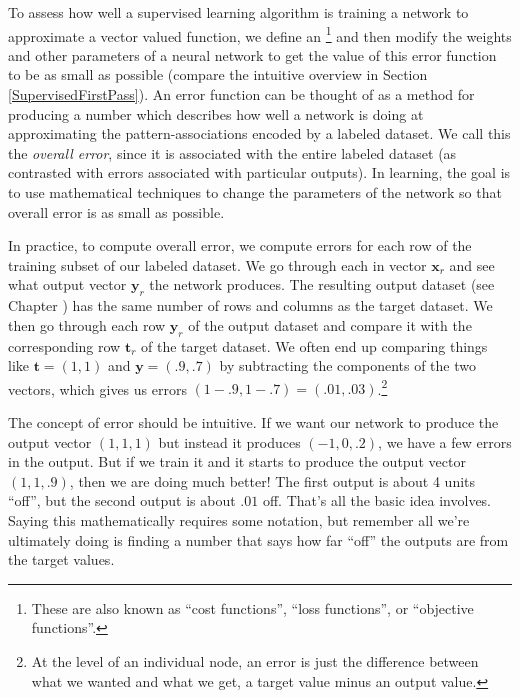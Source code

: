 To assess how well a supervised learning algorithm is training a network to approximate a vector valued function, we  define an \footnote{These are also known as ``cost functions'', ``loss functions'', or ``objective functions''.} and then modify the weights and other parameters of a neural network to get the value of this error function to be as small as possible (compare the intuitive overview in Section \ref{SupervisedFirstPass}). An error function can be thought of as a method for producing a number which describes how well a network is doing at approximating the pattern-associations encoded by a labeled dataset. We call this the \emph{overall error}, since it is associated with the entire labeled dataset (as contrasted with errors associated with particular outputs). In learning, the goal is to use mathematical techniques to change the parameters of the network so that overall error is as small as possible.

In practice, to compute overall error, we compute errors for each row of the training subset of our labeled dataset. We go through each in vector $\mathbf{x}_r$ and see what output vector $\mathbf{y}_r$ the network produces. The resulting output dataset (see Chapter ) has the same number of rows and columns as the target dataset. We then go through each row $\mathbf{y}_r$ of the output dataset and compare it with the corresponding row $\mathbf{t}_r$ of the target dataset. We often end up comparing things like $\mathbf{t}  =  (1,1)$ and $\mathbf{y}  =  (.9,.7)$ by subtracting the components of the two vectors, which gives us  errors $(1-.9,1-.7) = (.01,.03)$.\footnote{At the level of an individual node, an error is just the difference between what we wanted and what we get, a target value minus an output value.}


The concept of error should be intuitive. If we want our network to produce the output vector $(1,1,1)$ but instead it produces $(-1,0,.2)$, we have a few errors in the output. But if we train it and it starts to produce the output vector $(1,1,.9)$, then we are doing much better! The first output is about 4 units ``off'', but the second output is about $.01$ off. That's all the basic idea involves. Saying this mathematically requires some notation, but remember all we're ultimately doing is finding a number that says how far ``off'' the outputs are from the target values.

